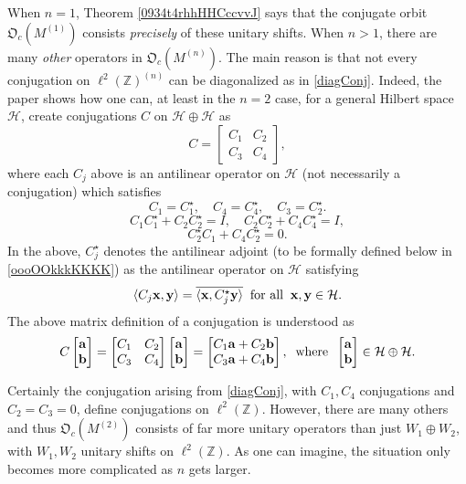 \documentclass{dis}
\theoremstyle{plain}
\theoremstyle{definition}
\def\Z{\mathbb{Z}}
\renewcommand{\vec}[1]{{\bf #1}}
\newcommand{\0}{{\color{lightgray}0}}
\begin{document}
When $n = 1$, Theorem \ref{0934t4rhhHHCccvvJ} says that the conjugate orbit $\mathfrak{O}_c(M^{(1)})$ consists {\em precisely}  of these unitary shifts. When $n > 1$, there are many {\em other }operators in $\mathfrak{O}_c(M^{(n)})$. The main reason is that not every conjugation on $\ell^{2}(\Z)^{(n)}$ can be diagonalized as in \eqref{diagConj}. Indeed, the paper \cite{Ko03062019} shows how one can, at least in the $n = 2$ case, for a general Hilbert space $\mathcal{H}$, create conjugations $C$ on $\mathcal{H} \oplus \mathcal{H}$ as 
$$C = \begin{bmatrix} C_{1} & C_{2}\\ C_{3} & C_{4}\end{bmatrix},$$
where each $C_j$ above is an antilinear operator on $\mathcal{H}$  (not necessarily a conjugation) which satisfies 
$$C_{1} = C_{1}^{\star}, \quad C_{4} = C_{4}^{\star},  \quad C_{3} = C_{2}^{\star}.$$
$$C_{1} C_{1}^{\star} + C_{2} C_{2}^{\star} = I, \quad C_{2} C_{2}^{\star} + C_{4} C_{4}^{\star} = I,$$
$$C_{2}^{\star} C_{1} + C_{4} C_{2}^{\star} = 0.$$
In the above, $C_{j}^{\star}$ denotes the antilinear adjoint (to be formally defined below in \eqref{oooOOkkkKKKK}) as the antilinear operator on $\mathcal{H}$ satisfying 
$$\langle C_{j} \vec{x}, \vec{y}\rangle = \overline{\langle \vec{x}, C_{j}^{\star} \vec{y}\rangle} \; \; \mbox{for all} \; \;  \vec{x}, \vec{y} \in \mathcal{H}.$$ The above matrix definition of a conjugation  is understood as 
$$C \begin{bmatrix} \vec{a} \\ \vec{b} \end{bmatrix}  =  \begin{bmatrix} C_{1} & C_{2}\\ C_{3} & C_{4}\end{bmatrix}  \begin{bmatrix} \vec{a} \\ \vec{b} \end{bmatrix} =  \begin{bmatrix}C_{1} \vec{a}  + C_{2} \vec{b}\\ C_{3} \vec{a} + C_{4} \vec{b} \end{bmatrix}, \; \; \mbox{where} \; \; \begin{bmatrix} \vec{a} \\ \vec{b} \end{bmatrix}  \in \mathcal{H} \oplus \mathcal{H}.$$


Certainly the conjugation arising from \eqref{diagConj}, with $C_{1}, C_{4}$ conjugations and $C_{2}  = C_{3} = 0$, define conjugations on $\ell^{2}(\Z)$. However, there are many others and thus $\mathfrak{O}_c(M^{(2)})$ consists of far more unitary operators than just $W_{1} \oplus W_2$, with $W_{1}, W_{2}$  unitary shifts on $\ell^2(\Z)$. As one can imagine, the situation only becomes more complicated as $n$ gets larger. 
\end{document}
